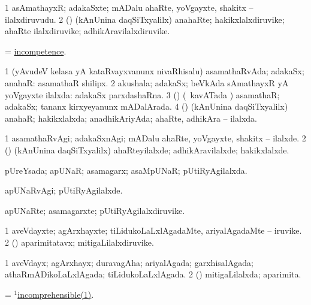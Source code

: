 \bentry
{}
\gl{\nA}
\bmng
\bnum
\num{1} asAmathayxR; adakaSxte; mADalu ahaRte, yoVgayxte, shakitx -- ilalxdiruvudu. 
\num{2} (\nAyxshA) (kAnUnina daqSiTxyalilx) anahaRte; hakikxlalxdiruvike; ahaRte ilalxdiruvike; adhikAravilalxdiruvike. 
\enum
\emng
\eentry

\bentry
{}
\gl{\nA}
\bmng
 = \hyperlink{incompetence}{incompetence}. 
\emng
\eentry

\bentry
{}
\gl{\gu}
\bmng
\bnum
\num{1} (yAvudeV kelasa yA kataRvayxvanunx nivaRhisalu) asamathaRvAda; adakaSx; anahaR:  asamathaR shilipx. 
\num{2} akushala; adakaSx; beVkAda sAmathayxR yA yoVgayxte ilalxda:  adakaSx parxdashaRna. 
\num{3} (\veYshA) (\kanmu\ kavATada \vi) asamathaR; adakaSx; tananx kirxyeyanunx mADalArada. 
\num{4} (\nAyxshA) (kAnUnina daqSiTxyalilx) anahaR; hakikxlalxda; anadhikAriyAda; ahaRte, adhikAra -- ilalxda. 
\enum
\emng
\eentry

\bentry
{}
\gl{\kirxvi}
\bmng
\bnum
\num{1} asamathaRvAgi; adakaSxnAgi; mADalu ahaRte, yoVgayxte, shakitx -- ilalxde. 
\num{2} (\nAyxshA) (kAnUnina daqSiTxyalilx) ahaRteyilalxde; adhikAravilalxde; hakikxlalxde. 
\enum
\emng
\eentry

\bentry
{}
\gl{\gu}
\bmng
pUreYsada; apUNaR; asamagarx; asaMpUNaR; pUtiRyAgilalxda. 
\emng
\eentry

\bentry
{}
\gl{\kirxvi}
\bmng
apUNaRvAgi; pUtiRyAgilalxde. 
\emng
\eentry

\bentry
{}
\gl{\nA}
\bmng
apUNaRte; asamagarxte; pUtiRyAgilalxdiruvike. 
\emng
\eentry

\bentry
{}
\gl{\nA}
\bmng
\bnum
\num{1} aveVdayxte; agArxhayxte; tiLidukoLaLxlAgadaMte, ariyalAgadaMte -- iruvike. 
\num{2} (\pArxparx) aparimitatavx; mitigaLilalxdiruvike. 
\enum
\emng
\eentry

\bentry
{}
\gl{\gu}
\bmng
\bnum
\num{1} aveVdayx; agArxhayx; duravagAha; ariyalAgada; garxhisalAgada; athaRmADikoLaLxlAgada; tiLidukoLaLxlAgada. 
\num{2} (\pArxparx) mitigaLilalxda; aparimita. 
\enum
\emng

\noindent
\gl{\pagu}
\bmng
{} = \hyperlink{incomprehensible(1)}{$^1$incomprehensible(1)}. 
\emng
\eentry

